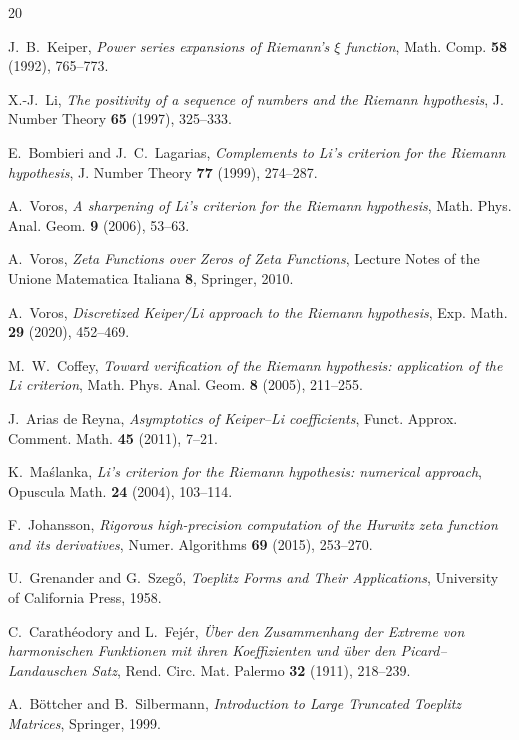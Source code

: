 \documentclass[11pt,oneside]{article}
\theoremstyle{remark}
\begin{document}
\begin{thebibliography}{20}

 J.~B.~Keiper,
\emph{Power series expansions of Riemann's $\xi$ function},
Math. Comp. \textbf{58} (1992), 765--773.

 X.-J.~Li,
\emph{The positivity of a sequence of numbers and the Riemann hypothesis},
J. Number Theory \textbf{65} (1997), 325--333.

 E.~Bombieri and J.~C.~Lagarias,
\emph{Complements to Li's criterion for the Riemann hypothesis},
J. Number Theory \textbf{77} (1999), 274--287.

 A.~Voros,
\emph{A sharpening of Li's criterion for the Riemann hypothesis},
Math. Phys. Anal. Geom. \textbf{9} (2006), 53--63.

 A.~Voros,
\emph{Zeta Functions over Zeros of Zeta Functions},
Lecture Notes of the Unione Matematica Italiana \textbf{8}, Springer, 2010.

 A.~Voros,
\emph{Discretized Keiper/Li approach to the Riemann hypothesis},
Exp. Math. \textbf{29} (2020), 452--469.

 M.~W.~Coffey,
\emph{Toward verification of the Riemann hypothesis: application of the Li
criterion}, Math. Phys. Anal. Geom. \textbf{8} (2005), 211--255.

 J.~Arias de Reyna,
\emph{Asymptotics of Keiper--Li coefficients},
Funct. Approx. Comment. Math. \textbf{45} (2011), 7--21.

 K.~Ma\'slanka,
\emph{Li's criterion for the Riemann hypothesis: numerical approach},
Opuscula Math. \textbf{24} (2004), 103--114.

 F.~Johansson,
\emph{Rigorous high-precision computation of the Hurwitz zeta function and its
derivatives}, Numer. Algorithms \textbf{69} (2015), 253--270.

 U.~Grenander and G.~Szeg\H{o},
\emph{Toeplitz Forms and Their Applications},
University of California Press, 1958.

 C.~Carath\'eodory and L.~Fej\'er,
\emph{\"Uber den Zusammenhang der Extreme von harmonischen Funktionen mit
ihren Koeffizienten und \"uber den Picard--Landauschen Satz},
Rend. Circ. Mat. Palermo \textbf{32} (1911), 218--239.

 A.~B\"ottcher and B.~Silbermann,
\emph{Introduction to Large Truncated Toeplitz Matrices},
Springer, 1999.


\end{thebibliography}
\end{document}
